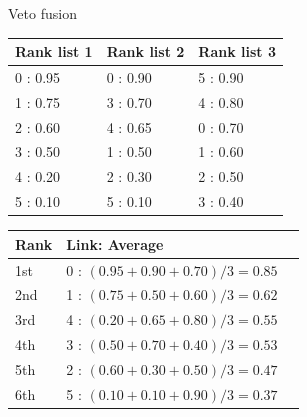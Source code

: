 \begin{example}
  \centering
  \caption{Veto fusion}
  \label{ex:veto}

  \begin{subexample}{\linewidth}
    \centering
    \begin{tabular}{l l l}
      \toprule
      Rank list 1 & Rank list 2 & Rank list 3 \\
      \midrule
      0 : 0.95    & 0 : 0.90    & 5 : 0.90 \\
      1 : 0.75    & 3 : 0.70    & 4 : 0.80 \\
      2 : 0.60    & 4 : 0.65    & 0 : 0.70 \\
      3 : 0.50    & 1 : 0.50    & 1 : 0.60 \\
      4 : 0.20    & 2 : 0.30    & 2 : 0.50 \\
      5 : 0.10    & 5 : 0.10    & 3 : 0.40 \\
      \bottomrule
    \end{tabular}
  \end{subexample}

  \vspace{0.5cm}

  \begin{subexample}{\linewidth}
    \centering
    \begin{tabular}{l l l}
      \toprule
      Rank & Link: Average \\
      \midrule
      1st & 0 : $(0.95 + 0.90 + 0.70)/3 = 0.85$ \\
      2nd & 1 : $(0.75 + 0.50 + 0.60)/3 = 0.62$ \\
      3rd & 4 : $(0.20 + 0.65 + 0.80)/3 = 0.55$ \\
      4th & 3 : $(0.50 + 0.70 + 0.40)/3 = 0.53$ \\
      5th & 2 : $(0.60 + 0.30 + 0.50)/3 = 0.47$ \\
      6th & 5 : $(0.10 + 0.10 + 0.90)/3 = 0.37$ \\
      \bottomrule
    \end{tabular}
  \end{subexample}

  \vspace{0.5cm}


\end{example}
